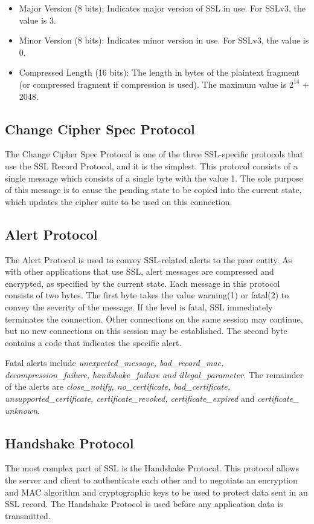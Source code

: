\documentclass[12pt]{article}
\begin{document}
\begin{enumerate}
\begin{itemize}
\item Major Version (8 bits): Indicates major version of SSL in use. For SSLv3, the value is 3.
\item Minor Version (8 bits): Indicates minor version in use. For SSLv3, the value is 0.
\item Compressed Length (16 bits): The length in bytes of the plaintext fragment (or compressed fragment if compression is used). The maximum value is $2^{14}$ + 2048.
\end{itemize}
\end{enumerate}

\subsection{Change Cipher Spec Protocol}
The Change Cipher Spec Protocol is one of the three SSL-specific protocols that use the SSL Record Protocol, and it is the simplest. This protocol consists of a single message which consists of a single byte with the value 1. The sole purpose of this message is to cause the pending state to be copied into the current state, which updates the cipher suite to be used on this connection.
\subsection{Alert Protocol}
The Alert Protocol is used to convey SSL-related alerts to the peer entity. As with other applications that use SSL, alert messages are compressed and encrypted, as specified by the current state.
Each message in this protocol consists of two bytes. The first byte takes the value
warning(1) or fatal(2) to convey the severity of the message. If the level is fatal, SSL immediately terminates the connection. Other connections on the same session may continue, but no new connections on this session may be established. The second byte contains a code that indicates the specific alert. 

Fatal alerts include \textit{unexpected\_message, bad\_record\_mac, decompression\_failure, handshake\_failure and illegal\_parameter. } 
The remainder of the alerts are 
\textit{close\_notify,
no\_certificate,
bad\_certificate, unsupported\_certificate,
certificate\_revoked,
certificate\_expired} and
\textit{certificate\_ unknown}.

\subsection{Handshake Protocol}
The most complex part of SSL is the Handshake Protocol. This protocol allows the server and client to authenticate each other and to negotiate an encryption and MAC algorithm and cryptographic keys to be used to protect data sent in an SSL record. The Handshake Protocol is used before any application data is transmitted.
\end{document}
